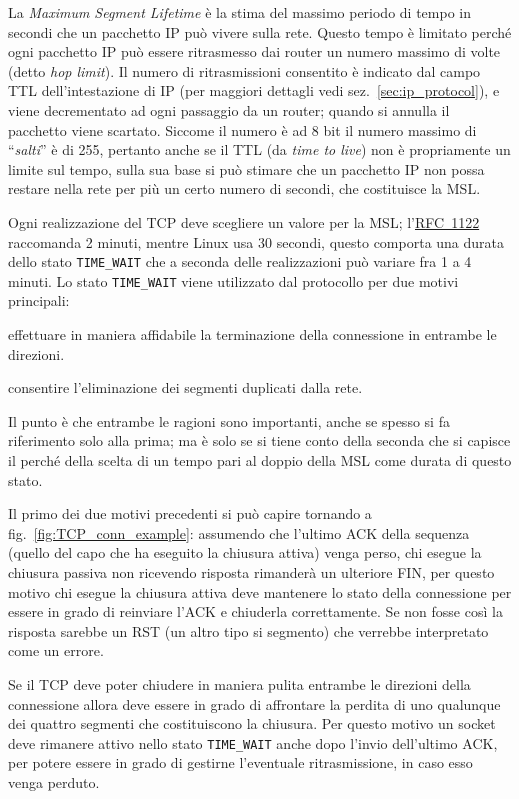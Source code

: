 La \textit{Maximum Segment Lifetime} è la stima del massimo periodo di tempo
in secondi che un pacchetto IP può vivere sulla rete. Questo tempo è limitato
perché ogni pacchetto IP può essere ritrasmesso dai router un numero massimo
di volte (detto \textit{hop limit}).  Il numero di ritrasmissioni consentito è
indicato dal campo TTL dell'intestazione di IP (per maggiori dettagli vedi
sez.~\ref{sec:ip_protocol}), e viene decrementato ad ogni passaggio da un
router; quando si annulla il pacchetto viene scartato.  Siccome il numero è ad
8 bit il numero massimo di ``\textsl{salti}'' è di 255, pertanto anche se il
TTL (da \textit{time to live}) non è propriamente un limite sul tempo, sulla
sua base si può stimare che un pacchetto IP non possa restare nella rete per
più un certo numero di secondi, che costituisce la MSL.

Ogni realizzazione del TCP deve scegliere un valore per la MSL;
l'\href{http://www.ietf.org/rfc/rfc1122.txt}{RFC~1122} raccomanda 2 minuti,
mentre Linux usa 30 secondi, questo comporta una durata dello stato
\texttt{TIME\_WAIT} che a seconda delle realizzazioni può variare fra 1 a 4
minuti.  Lo stato \texttt{TIME\_WAIT} viene utilizzato dal protocollo per due
motivi principali:
\begin{enumerate*}
\item effettuare in maniera affidabile la terminazione della connessione
  in entrambe le direzioni.
\item consentire l'eliminazione dei segmenti duplicati dalla rete. 
\end{enumerate*}

Il punto è che entrambe le ragioni sono importanti, anche se spesso si fa
riferimento solo alla prima; ma è solo se si tiene conto della seconda che si
capisce il perché della scelta di un tempo pari al doppio della MSL come
durata di questo stato.

Il primo dei due motivi precedenti si può capire tornando a
fig.~\ref{fig:TCP_conn_example}: assumendo che l'ultimo ACK della sequenza
(quello del capo che ha eseguito la chiusura attiva) venga perso, chi esegue
la chiusura passiva non ricevendo risposta rimanderà un ulteriore FIN, per
questo motivo chi esegue la chiusura attiva deve mantenere lo stato della
connessione per essere in grado di reinviare l'ACK e chiuderla correttamente.
Se non fosse così la risposta sarebbe un RST (un altro tipo si segmento) che
verrebbe interpretato come un errore.

Se il TCP deve poter chiudere in maniera pulita entrambe le direzioni della
connessione allora deve essere in grado di affrontare la perdita di uno
qualunque dei quattro segmenti che costituiscono la chiusura. Per questo
motivo un socket deve rimanere attivo nello stato \texttt{TIME\_WAIT} anche
dopo l'invio dell'ultimo ACK, per potere essere in grado di gestirne
l'eventuale ritrasmissione, in caso esso venga perduto.


